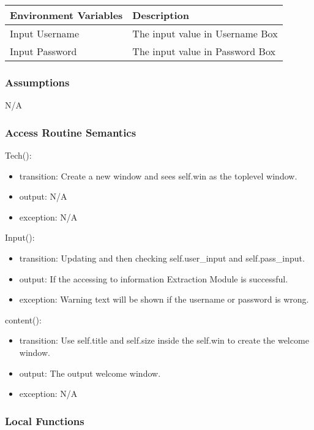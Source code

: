 \documentclass[12pt, titlepage]{article}
\begin{document}
\begin{center}
\begin{tabular}{|p{8cm}|p{6cm}|}
\hline
\textbf{Environment Variables} & \textbf{Description}\\
\hline
Input Username & The input value in Username Box\\
\hline
Input Password & The input value in Password Box\\
\hline

\end{tabular}
\end{center}

\subsubsection{Assumptions}

N/A

\subsubsection{Access Routine Semantics}

\noindent Tech():
\begin{itemize} 
\item transition: Create a new window and sees self.win as the toplevel window.
\item output: N/A
\item exception: N/A 
\end{itemize}
\noindent Input():
\begin{itemize} 
\item transition: Updating and then checking self.user\_input and self.pass\_input.
\item output: If the accessing to information Extraction Module is successful.
\item exception: Warning text will be shown if the username or password is wrong.
\end{itemize}
\noindent content():
\begin{itemize} 
\item transition: Use self.title and self.size inside the self.win to create the welcome window.
\item output: The output welcome window.
\item exception: N/A 
\end{itemize}

\subsubsection{Local Functions}
\end{document}
